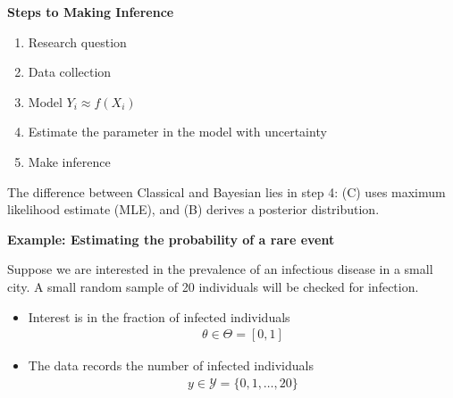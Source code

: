 \documentclass[12pt,xcolor=svgnames]{beamer}
\newcommand{\bl}{\color{blue}}
\newcommand{\theme}{\color{FireBrick}}
\newcommand{\sk}{\vspace{.4cm}}
\newcommand{\chap}[1]{{\theme \Large \bf #1} \sk}
\begin{document}
\begin{frame}
\chap{Steps to Making Inference} 


\begin{enumerate}
\item Research question
\item Data collection
\item Model $Y_i \approx f(X_i)$ 
\item Estimate the parameter in the model with uncertainty
\item Make inference
\end{enumerate}

The difference between {\bl Classical} and {\bl Bayesian} lies in step 4: (C) uses maximum likelihood estimate (MLE), and (B) derives a posterior distribution.
\end{frame}


\begin{frame}
\chap{Example: Estimating the probability of a rare event}

Suppose we are interested in the prevalence of an infectious disease in a small city.  A small random sample of 20 individuals will be checked for infection.
\begin{itemize}
\item Interest is in the fraction of infected individuals
\begin{align*}
\theta \in \Theta =[0,1]
\end{align*}
\item The data records the number of infected individuals
\begin{align*}
y \in \mathcal{Y} =\{0,1, \ldots, 20\}
\end{align*}
\end{itemize}

\end{frame}
\end{document}
